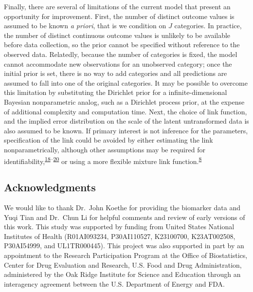 \documentclass[
]{article}
\begin{document}
Finally, there are several of limitations of the current model that present an opportunity for improvement. First, the number of distinct outcome values is assumed to be known \emph{a priori}, that is we condition on \(J\) categories. In practice, the number of distinct continuous outcome values is unlikely to be available before data collection, so the prior cannot be specified without reference to the observed data. Relatedly, because the number of categories is fixed, the model cannot accommodate new observations for an unobserved category; once the initial prior is set, there is no way to add categories and all predictions are assumed to fall into one of the original categories. It may be possible to overcome this limitation by substituting the Dirichlet prior for a infinite-dimensional Bayesian nonparametric analog, such as a Dirichlet process prior, at the expense of additional complexity and computation time. Next, the choice of link function, and the implied error distribution on the scale of the latent untransformed data is also assumed to be known. If primary interest is not inference for the parameters, specification of the link could be avoided by either estimating the link nonparametrically, although other assumptions may be required for identifiability,\textsuperscript{\protect\hyperlink{ref-song_semiparametric_2012}{18}--\protect\hyperlink{ref-mallick_bayesian_2003}{20}} or using a more flexible mixture link function.\textsuperscript{\protect\hyperlink{ref-lang_bayesian_1999}{8}}

\newpage

\hypertarget{acknowledgments}{%
\subsection{Acknowledgments}\label{acknowledgments}}

We would like to thank Dr.~John Koethe for providing the biomarker data and Yuqi Tian and Dr.~Chun Li for helpful comments and review of early versions of this work. This study was supported by funding from United States National Institutes of Health (R01AI093234, P30AI110527, K23100700, K23AT002508, P30AI54999, and UL1TR000445). This project was also supported in part by an appointment to the Research Participation Program at the Office of Biostatistics, Center for Drug Evaluation and Research, U.S. Food and Drug Administration, administered by the Oak Ridge Institute for Science and Education through an interagency agreement between the U.S. Department of Energy and FDA.
\end{document}
